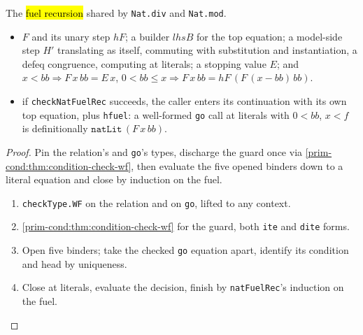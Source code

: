\begin{theorem}
  \label{prim-divmod:thm:checknatfuelrec-wf}
  \leanok

   The \hl{fuel recursion} shared by \texttt{Nat.div} and \texttt{Nat.mod}.
  \begin{itemize}
  \item {} $F$ and its unary step $hF$; a builder $\mathit{lhsB}$ for the top equation; a
    model-side step $H'$ translating as itself, commuting with substitution and instantiation, a
    defeq congruence, computing at literals; a stopping value $E$; and
    $x < \mathit{bb} \Rightarrow F\,x\,\mathit{bb} = E\,x$, $0 < \mathit{bb} \le x \Rightarrow F\,x\,\mathit{bb} = hF\,(F\,(x - \mathit{bb})\,\mathit{bb})$.
  \item {} if \texttt{checkNatFuelRec} succeeds, the caller enters its continuation with
    its own top equation, plus \texttt{hfuel}: a well-formed \texttt{go} call at literals with
    $0 < \mathit{bb}$, $x < f$ is definitionally $\mathtt{natLit}\,(F\,x\,\mathit{bb})$.
  \end{itemize}
\end{theorem}
\begin{proof}
  \leanok
   Pin the relation's and \texttt{go}'s types, discharge the guard once via
  \ref{prim-cond:thm:condition-check-wf}, then evaluate the five opened binders down to a literal
  equation and close by induction on the fuel.
  \begin{enumerate}
  \item \texttt{checkType.WF} on the relation and on \texttt{go}, lifted to any context.
  \item \ref{prim-cond:thm:condition-check-wf} for the guard, both \texttt{ite} and \texttt{dite}
    forms.
  \item Open five binders; take the checked \texttt{go} equation apart, identify its condition and
    head by uniqueness.
  \item Close at literals, evaluate the decision, finish by \texttt{natFuelRec}'s induction on the
    fuel.
  \end{enumerate}
\end{proof}

